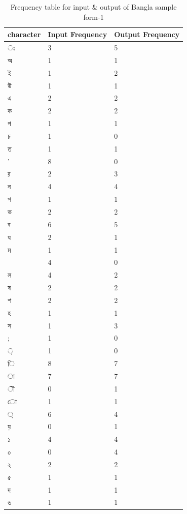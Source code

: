 \begin{table}[H]
\centering
\begin{tabular}{|p{2cm}|p{2cm}|p{2cm}|}
\hline
character & Input Frequency & Output Frequency \\
\hline
{\bengalifont ঃ} & 3 & 5\\
\hline
{\bengalifont অ} & 1 & 1\\
\hline
{\bengalifont ই} & 1 & 2\\
\hline
{\bengalifont উ} & 1 & 1\\
\hline
{\bengalifont এ} & 2 & 2\\
\hline
{\bengalifont ক} & 2 & 2\\
\hline
{\bengalifont গ} & 1 & 1\\
\hline
{\bengalifont চ} & 1 & 0\\
\hline
{\bengalifont ত} & 1 & 1\\
\hline
{\bengalifont '} & 8 & 0\\
\hline
{\bengalifont র} & 2 & 3\\
\hline
{\bengalifont ন} & 4 & 4\\
\hline
{\bengalifont প} & 1 & 1\\
\hline
{\bengalifont ভ} & 2 & 2\\
\hline
{\bengalifont ব} & 6 & 5\\
\hline
{\bengalifont য} & 2 & 1\\
\hline
{\bengalifont ম} & 1 & 1\\
\hline
{\bengalifont 0} & 4 & 0\\
\hline
{\bengalifont ল} & 4 & 2\\
\hline
{\bengalifont ষ} & 2 & 2\\
\hline
{\bengalifont শ} & 2 & 2\\
\hline
{\bengalifont হ} & 1 & 1\\
\hline
{\bengalifont স} & 1 & 3\\
\hline
{\bengalifont ;} & 1 & 0\\
\hline
{\bengalifont ়} & 1 & 0\\
\hline
{\bengalifont ি} & 8 & 7\\
\hline
{\bengalifont া} & 7 & 7\\
\hline
{\bengalifont ী} & 0 & 1\\
\hline
{\bengalifont ো} & 1 & 1\\
\hline
{\bengalifont ্} & 6 & 4\\
\hline
{\bengalifont য়} & 0 & 1\\
\hline
{\bengalifont ১} & 4 & 4\\
\hline
{\bengalifont ০} & 0 & 4\\
\hline
{\bengalifont ২} & 2 & 2\\
\hline
{\bengalifont ৫} & 1 & 1\\
\hline
{\bengalifont দ} & 1 & 1\\
\hline
{\bengalifont ৬} & 1 & 1\\
\hline
\end{tabular}
\caption { Frequency table for input \& output of Bangla sample form-1}
\label {tab:BTable1}
\end{table}

